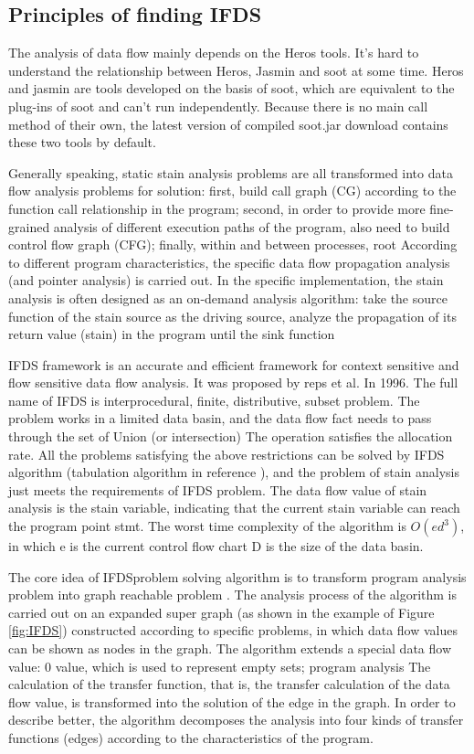 \documentclass{article}
\begin{document}
\subsection{Principles of finding IFDS}
The analysis of data flow mainly depends on the Heros tools. It's hard to understand the relationship between Heros, Jasmin and soot at some time. Heros and jasmin are tools developed on the basis of soot, which are equivalent to the plug-ins of soot and can't run independently. Because there is no main call method of their own, the latest version of compiled soot.jar download contains these two tools by default.

Generally speaking, static stain analysis problems are all transformed into data flow analysis problems  for solution: first, build call graph (CG) according to the function call relationship in the program; second, in order to provide more fine-grained analysis of different execution paths of the program, also need to build control flow graph (CFG); finally, within and between processes, root According to different program characteristics, the specific data flow propagation analysis (and pointer analysis) is carried out. In the specific implementation, the stain analysis is often designed as an on-demand analysis algorithm: take the source function of the stain source as the driving source, analyze the propagation of its return value (stain) in the program until the sink function

IFDS framework  is an accurate and efficient framework for context sensitive and flow sensitive data flow analysis. It was proposed by reps et al. In 1996. The full name of IFDS is interprocedural, finite, distributive, subset problem. The problem works in a limited data basin, and the data flow fact needs to pass through the set of Union (or intersection) The operation satisfies the allocation rate. All the problems satisfying the above restrictions can be solved by IFDS algorithm (tabulation algorithm in reference ), and the problem of stain analysis just meets the requirements of IFDS problem. The data flow value of stain analysis is the stain variable, indicating that the current stain variable can reach the program point stmt. The worst time complexity of the algorithm is $O (ed^{3})$, in which e is the current control flow chart D is the size of the data basin.

The core idea of IFDSproblem solving algorithm is to transform program analysis problem into graph reachable problem . The analysis process of the algorithm is carried out on an expanded super graph (as shown in the example of Figure \ref{fig:IFDS}) constructed according to specific problems, in which data flow values can be shown as nodes in the graph. The algorithm extends a special data flow value: 0 value, which is used to represent empty sets; program analysis The calculation of the transfer function, that is, the transfer calculation of the data flow value, is transformed into the solution of the edge in the graph. In order to describe better, the algorithm decomposes the analysis into four kinds of transfer functions (edges) according to the characteristics of the program.
\end{document}
